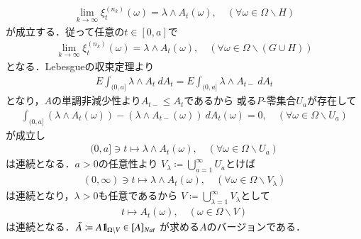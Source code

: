 \begin{prf}
\begin{description}
				\begin{align}
					\lim_{k \to \infty} \xi^{(n_k)}_t(\omega) = \lambda \wedge A_t(\omega),
					\quad (\forall \omega \in \Omega \backslash H)
				\end{align}
				が成立する．従って任意の$t \in [0,a]$で
				\begin{align}
					\lim_{k \to \infty} \xi^{(n_k)}_t(\omega) = \lambda \wedge A_t(\omega),
					\quad (\forall \omega \in \Omega \backslash (G \cup H))
				\end{align}
				となる．Lebesgueの収束定理より
				\begin{align}
					E\int_{(0,a]} \lambda \wedge A_t\ dA_t
					= E\int_{(0,a]} \lambda \wedge A_{t-}\ dA_t
				\end{align}
				となり，$A$の単調非減少性より$A_{t-} \leq A_t$であるから
				或る$P$-零集合$U_a$が存在して
				\begin{align}
					\int_{(0,a]} (\lambda \wedge A_t(\omega)) 
					- (\lambda \wedge A_{t-}(\omega))\ dA_t(\omega) = 0,
					\quad (\forall \omega \in \Omega \backslash U_a)
				\end{align}
				が成立し
				\begin{align}
					(0,a] \ni t \longmapsto \lambda \wedge A_t(\omega),
					\quad (\forall \omega \in \Omega \backslash U_a)
				\end{align}
				は連続となる．$a > 0$の任意性より
				$V_\lambda \coloneqq \bigcup_{a=1}^\infty U_a$とけば
				\begin{align}
					(0,\infty) \ni t \longmapsto \lambda \wedge A_t(\omega),
					 \quad (\forall \omega \in \Omega \backslash V_\lambda)
				\end{align}
				は連続となり，$\lambda > 0$も任意であるから
				$V \coloneqq \bigcup_{\lambda=1}^\infty V_\lambda$として
				\begin{align}
					t \longmapsto A_t(\omega),
					\quad (\omega \in \Omega \backslash V)
				\end{align}
				は連続となる．$\tilde{A} \coloneqq A \mbox{1}\hspace{-0.25em}\mbox{l}_{\Omega \backslash V} \in [A]_{Nat}$
				が求める$A$のバージョンである．
				\QED
		\end{description}
	\end{prf}